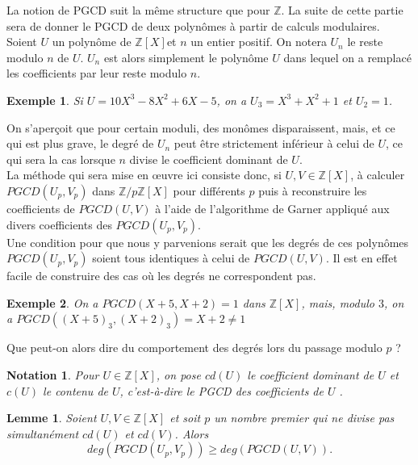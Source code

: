 \documentclass[12pt]{report}
\newtheorem*{ex}{Exemple}
\newtheorem{Lem}[thm]{Lemme}
\newtheorem*{nota}{Notation}
\begin{document}
La notion de PGCD suit la même structure que pour $\mathbb{Z}$. La suite de cette partie sera de donner le PGCD de deux polynômes à partir de calculs modulaires.\\

Soient $U$ un polynôme de $\mathbb{Z}[X]$et $n$ un entier positif. On notera $U_n$ le reste modulo $n$ de $U$. $U_n$ est alors simplement le polynôme $U$ dans lequel on a remplacé les coefficients par leur reste modulo $n$.

\begin{ex}
Si $U=10X^3-8X^2+6X-5$, on a $U_3= X^3+ X^2 +1$ et $U_2=1$.
\end{ex}

On s'aperçoit que pour certain moduli, des monômes disparaissent, mais, et ce qui est plus grave, le degré de $U_n$ peut être strictement inférieur à celui de $U$, ce qui sera la cas lorsque $n$ divise le coefficient dominant de $U$.\\

La méthode qui sera mise en œuvre ici consiste donc, si $U,V\in \mathbb{Z}[X] $, à calculer $PGCD(U_p,V_p)$ dans $\mathbb{Z}/p\mathbb{Z}[X]$ pour différents $p$ puis à reconstruire les coefficients de $PGCD(U,V)$ à l'aide de l'algorithme de Garner appliqué aux divers coefficients des $PGCD(U_p,V_p)$. \\

Une condition pour que nous y parvenions serait que les degrés de ces polynômes $PGCD(U_p,V_p)$ soient tous identiques à celui de $PGCD(U,V)$. Il est en effet facile de construire des cas où les degrés ne correspondent pas.

\begin{ex}
On a $PGCD(X+5,X+2)=1$ dans $\mathbb{Z}[X]$, mais, modulo $3$, on a $PGCD((X+5)_3,(X+2)_3)=X+2\neq 1$
\end{ex}


Que peut-on alors dire du comportement des degrés lors du passage modulo $p$ ?


\begin{nota}
Pour $U \in \mathbb{Z}[X]$, on pose $cd(U)$ le coefficient dominant de $U$ et $c(U)$ le contenu de $U$, c'est-à-dire le PGCD des coefficients de $U$ .
\end{nota}

\begin{Lem}
Soient $U,V \in \mathbb{Z}[X]$ et soit $p$ un nombre premier qui ne divise pas simultanément $cd(U)$ et $cd(V)$. Alors
$$ deg (PGCD(U_p,V_p))\geq deg( PGCD(U,V) ).      $$ 
\end{Lem}
\end{document}
